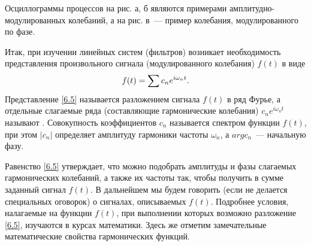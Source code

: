 


%

Осциллограммы процессов на рис. а, б являются примерами амплитудно-модулированных колебаний, а на рис. в~--- пример
колебания, модулированного по фазе.



Итак, при изучении линейных систем (фильтров) возникает необходимость представления произвольного сигнала
(модулированного колебания) $f(t)$ в виде
\begin{equation}
	\eqmark{6.5}
	f(t)=\sum c_n e^{i\omega_n t}.
\end{equation}
Представление \eqref{6.5} называется разложением сигнала $f(t)$ в ряд Фурье, а отдельные слагаемые ряда (составляющие
гармонические колебания) $c_n e^{i\omega_n t}$ называют . Совокупность коэффициентов $c_n$ называется
спектром функции $f(t)$, при этом $|c_n|$ определяет амплитуду гармоники частоты $\omega_n$, а $arg c_n$~--- начальную
фазу.

Равенство \eqref{6.5} утверждает, что можно подобрать амплитуды и фазы слагаемых гармонических колебаний, а также их частоты
так, чтобы получить в сумме заданный сигнал $f(t)$. В дальнейшем мы будем говорить (если не делается специальных
оговорок) о сигналах, описываемых  $f(t)$. Подробнее условия, налагаемые на функции
$f(t)$, при выполнении которых возможно разложение \eqref{6.5}, изучаются в курсах математики. Здесь же отметим
замечательные математические свойства гармонических функций.

